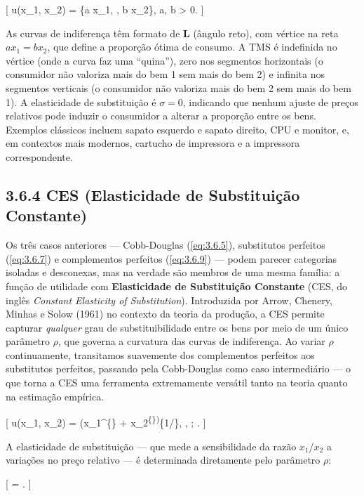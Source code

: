\documentclass[11pt,twoside,openright]{book}
\begin{document}
{[} u(x\_1, x\_2) = \min\{a x\_1, , b x\_2\}, \quad a, b \textgreater{}
0. \label{eq:3.6.9}  {]}

As curvas de indiferença têm formato de \textbf{L} (ângulo reto), com
vértice na reta \(a x_1 = b x_2\), que define a proporção ótima de
consumo. A TMS é indefinida no vértice (onde a curva faz uma ``quina''),
zero nos segmentos horizontais (o consumidor não valoriza mais do bem 1
sem mais do bem 2) e infinita nos segmentos verticais (o consumidor não
valoriza mais do bem 2 sem mais do bem 1). A elasticidade de
substituição é \(\sigma = 0\), indicando que nenhum ajuste de preços
relativos pode induzir o consumidor a alterar a proporção entre os bens.
Exemplos clássicos incluem sapato esquerdo e sapato direito, CPU e
monitor, e, em contextos mais modernos, cartucho de impressora e a
impressora correspondente.

\subsection{3.6.4 CES (Elasticidade de Substituição
Constante)}\label{ces-elasticidade-de-substituiuxe7uxe3o-constante}

Os três casos anteriores --- Cobb-Douglas (\ref{eq:3.6.5}), substitutos
perfeitos (\ref{eq:3.6.7}) e complementos perfeitos (\ref{eq:3.6.9}) ---
podem parecer categorias isoladas e desconexas, mas na verdade são
membros de uma mesma família: a função de utilidade com
\textbf{Elasticidade de Substituição Constante} (CES, do inglês
\emph{Constant Elasticity of Substitution}). Introduzida por Arrow,
Chenery, Minhas e Solow (1961) no contexto da teoria da produção, a CES
permite capturar \emph{qualquer} grau de substituibilidade entre os bens
por meio de um único parâmetro \(\rho\), que governa a curvatura das
curvas de indiferença. Ao variar \(\rho\) continuamente, transitamos
suavemente dos complementos perfeitos aos substitutos perfeitos,
passando pela Cobb-Douglas como caso intermediário --- o que torna a CES
uma ferramenta extremamente versátil tanto na teoria quanto na estimação
empírica.

{[} u(x\_1, x\_2) = \left(x\_1\^{}\{\rho\} +
x\_2\textsuperscript{\{\rho\}\right)}\{1/\rho\}, \quad \rho {}, ;
\rho {}. \label{eq:3.6.10}  {]}

A elasticidade de substituição --- que mede a sensibilidade da razão
\(x_1/x_2\) a variações no preço relativo --- é determinada diretamente
pelo parâmetro \(\rho\):

{[} \sigma = . \label{eq:3.6.11}  {]}
\end{document}
